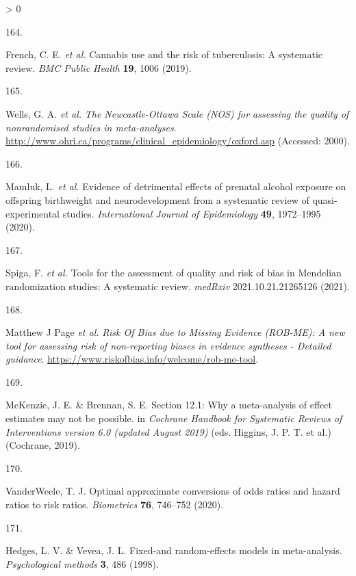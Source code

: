 \documentclass[a4paper, twoside]{templates/ociamthesis}
\newlength{\cslhangindent}
\newlength{\csllabelwidth}
\newenvironment{CSLReferences}[3] %
 {%
  \setlength{\parindent}{0pt}
  \ifodd #1 \everypar{\setlength{\hangindent}{\cslhangindent}}\ignorespaces\fi
  \ifnum #2 > 0
  \setlength{\parskip}{#2\baselineskip}
  \fi
 }%
 {}
\newcommand{\CSLLeftMargin}[1]{\parbox[t]{\maxof{\widthof{#1}}{\csllabelwidth}}{#1}}
\newcommand{\CSLRightInline}[1]{\parbox[t]{\linewidth - \csllabelwidth}{#1}}
\begin{document}
\begin{CSLReferences}{0}{0}
\leavevmode\hypertarget{ref-french2019}{}%
\CSLLeftMargin{164. }
\CSLRightInline{French, C. E. \emph{et al.} Cannabis use and the risk of tuberculosis: A systematic review. \emph{BMC Public Health} \textbf{19}, 1006 (2019).}

\leavevmode\hypertarget{ref-wells2000}{}%
\CSLLeftMargin{165. }
\CSLRightInline{Wells, G. A. \emph{et al.} \emph{The {Newcastle}-{Ottawa Scale} ({NOS}) for assessing the quality of nonrandomised studies in meta-analyses}. \url{http://www.ohri.ca/programs/clinical_epidemiology/oxford.asp} (Accessed: 2000).}

\leavevmode\hypertarget{ref-mamluk2020}{}%
\CSLLeftMargin{166. }
\CSLRightInline{Mamluk, L. \emph{et al.} Evidence of detrimental effects of prenatal alcohol exposure on offspring birthweight and neurodevelopment from a systematic review of quasi-experimental studies. \emph{International Journal of Epidemiology} \textbf{49}, 1972--1995 (2020).}

\leavevmode\hypertarget{ref-spiga2021}{}%
\CSLLeftMargin{167. }
\CSLRightInline{Spiga, F. \emph{et al.} Tools for the assessment of quality and risk of bias in {Mendelian} randomization studies: A systematic review. \emph{medRxiv} 2021.10.21.21265126 (2021).}

\leavevmode\hypertarget{ref-zotero-15123}{}%
\CSLLeftMargin{168. }
\CSLRightInline{Matthew J Page \emph{et al.} \emph{Risk {Of Bias} due to {Missing Evidence} ({ROB}-{ME}): A new tool for assessing risk of non-reporting biases in evidence syntheses - {Detailed} guidance}. \url{https://www.riskofbias.info/welcome/rob-me-tool}.}

\leavevmode\hypertarget{ref-mckenzie2019}{}%
\CSLLeftMargin{169. }
\CSLRightInline{McKenzie, J. E. \& Brennan, S. E. Section 12.1: Why a meta-analysis of effect estimates may not be possible. in \emph{Cochrane {Handbook} for {Systematic Reviews} of {Interventions} version 6.0 (updated {August} 2019)} (eds. Higgins, J. P. T. et al.) ({Cochrane}, 2019).}

\leavevmode\hypertarget{ref-vanderweele2020}{}%
\CSLLeftMargin{170. }
\CSLRightInline{VanderWeele, T. J. Optimal approximate conversions of odds ratios and hazard ratios to risk ratios. \emph{Biometrics} \textbf{76}, 746--752 (2020).}

\leavevmode\hypertarget{ref-hedges1998}{}%
\CSLLeftMargin{171. }
\CSLRightInline{Hedges, L. V. \& Vevea, J. L. Fixed-and random-effects models in meta-analysis. \emph{Psychological methods} \textbf{3}, 486 (1998).}


\end{CSLReferences}
\end{document}
